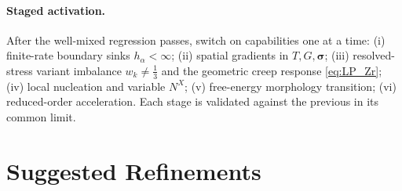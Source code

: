 \documentclass[11pt]{article}
\newcommand{\sig}{\bm{\sigma}}
\begin{document}
\paragraph{Staged activation.}
After the well-mixed regression passes, switch on capabilities one at a time:
(i) finite-rate boundary sinks $h_\alpha<\infty$; (ii) spatial gradients in
$T,G,\sig$; (iii) resolved-stress variant imbalance $w_k\neq\tfrac13$ and the
geometric creep response \eqref{eq:LP_Zr}; (iv) local nucleation and variable
$N^{X}$; (v) free-energy morphology transition; (vi) reduced-order acceleration.
Each stage is validated against the previous in its common limit.

\section{Suggested Refinements}
\label{sec:improvements}
\end{document}
